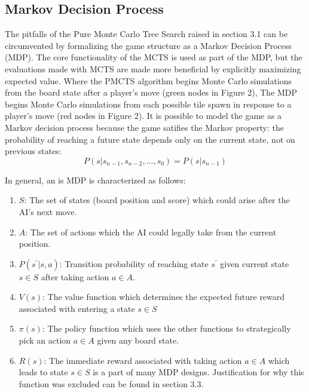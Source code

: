 \documentclass{article}
\begin{document}
\subsection{Markov Decision Process}
The pitfalls of the Pure Monte Carlo Tree Search raised in section 3.1 can be circumvented by formalizing the game structure as a Markov Decision Process (MDP).  The core functionality of the MCTS is used as part of the MDP, but the evaluations made with MCTS are made more beneficial by explicitly maximizing expected value.  Where the PMCTS algorithm begins Monte Carlo simulations from the board state after a player's move (green nodes in Figure 2), The MDP begins Monte Carlo simulations from each possible tile spawn in response to a player's move (red nodes in Figure 2).  It is possible to model the game as a Markov decision process because the game satifies the Markov property: the probability of reaching a future state depends only on the current state, not on previous states: 
$$P(s|s_{n-1}, s_{n-2},...,s_{0}) = P(s|s_{n-1}) $$

\noindent In general, an is MDP is characterized as follows:
\begin{enumerate}
	\item $S$: The set of states (board position and score) which could arise after the AI's next move.
	\item $A$: The set of actions which the AI could legally take from the current position.
	\item $P(s^\prime | s, a)$: Transition probability of reaching state $s^\prime$ given current state $s \in S$ after taking action $a \in A$.
	\item $V(s)$: The value function which determines the expected future reward associated with entering a state $s \in S$
	\item $\pi(s)$: The policy function which uses the other functions to strategically pick an action $a \in A$ given any board state.
	\item $R(s)$: The immediate reward associated with taking action $a \in A$ which leads to state $s \in S$ is a part of many MDP designs.  Justification for why this function was excluded can be found in section 3.3.
\end{enumerate}
\end{document}

